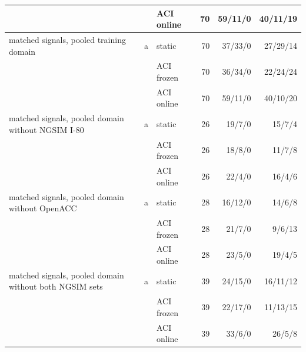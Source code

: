 \begin{table}[htbp]
\begin{tabular}{lllrrr}
 &  & ACI online & 70 & 59/11/0 & 40/11/19 \\
\midrule
matched signals, pooled training domain & a & static & 70 & 37/33/0 & 27/29/14 \\
 &  & ACI frozen & 70 & 36/34/0 & 22/24/24 \\
 &  & ACI online & 70 & 59/11/0 & 40/10/20 \\
\midrule
matched signals, pooled domain without NGSIM I-80 & a & static & 26 & 19/7/0 & 15/7/4 \\
 &  & ACI frozen & 26 & 18/8/0 & 11/7/8 \\
 &  & ACI online & 26 & 22/4/0 & 16/4/6 \\
\midrule
matched signals, pooled domain without OpenACC & a & static & 28 & 16/12/0 & 14/6/8 \\
 &  & ACI frozen & 28 & 21/7/0 & 9/6/13 \\
 &  & ACI online & 28 & 23/5/0 & 19/4/5 \\
\midrule
matched signals, pooled domain without both NGSIM sets & a & static & 39 & 24/15/0 & 16/11/12 \\
 &  & ACI frozen & 39 & 22/17/0 & 11/13/15 \\
 &  & ACI online & 39 & 33/6/0 & 26/5/8 \\
\bottomrule
\end{tabular}
\end{table}

